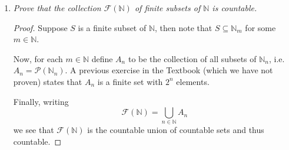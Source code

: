 \documentclass[12pt, reqno]{article}
\numberwithin{equation}{section}
\theoremstyle{definition}
\theoremstyle{remark}
\newcommand{\NN}{\mathbb{N}}
\renewcommand{\P}{\mathcal{P}}
\begin{document}
\begin{enumerate}[leftmargin=*]
\begin{proof}
		      Finally, suppose that $S$ and $T$ are both infinite. Then there exist bijective functions $f:\NN\to S$ and $g:\NN\to T$. It follows that the function $h:\NN\to S\cup T$ given by
		      \[
			      h(x) = \begin{cases}
				      g(x/2)     & \text{if $x$ is even} \\
				      f((x+1)/2) & \text{if $x$ is odd}
			      \end{cases}
		      \]
		      is a surjection (again, not necessarily a bijection). By theorem 1.3.10. in your textbook, $S\cup T$ is countable.
	      \end{proof}
	      \begin{proof}
		      We present an alternate proof in the case where $S$ and $T$ are both countably infinite. Let $f_1:\NN\to S$ and $f_2:\NN\to T$ be bijective functions. Now, consider the function $g: \NN\times \NN \to S\cup T$ given by
		      \[
			      g(n, m) = \begin{cases}
				      f_1(n) & \text{if } m=1   \\
				      f_2(n) & \text{if } m=2   \\
				      x_0    & \text{otherwise}
			      \end{cases}
		      \]
		      where $x_0$ is any point in $S\cup T$. Clearly, $g$ is a surjective function. Now, since $\NN\times\NN$ is countable, there exists a bijective function $h : \NN\to\NN\times \NN$. It follows that $g\circ h : \NN\to S\cup T$ is a surjective function. By theorem 1.3.10. in your textbook, $S\cup T$ is countable.
	      \end{proof}

	\item \emph{Prove that the collection $\mathcal{F}(\NN)$ of finite subsets of $\NN$ is countable.}

	      \begin{proof}
		      Suppose $S$ is a finite subset of $\NN$, then note that $S\subseteq \NN_m$ for some $m\in \NN$.

		      Now, for each $m\in\NN$ define $A_n$ to be the collection of all subsets of $\NN_{n}$, i.e. $A_n = \P(\NN_{n})$. A previous exercise in the Textbook (which we have not proven) states that $A_n$ is a finite set with $2^n$ elements.

		      Finally, writing
		      \[
			      \mathcal{F}(\NN) = \bigcup_{n\in\NN} A_n
		      \]
		      we see that $\mathcal{F}(\NN)$ is the countable union of countable sets and thus countable.
	      \end{proof}


\end{enumerate}
\end{document}
